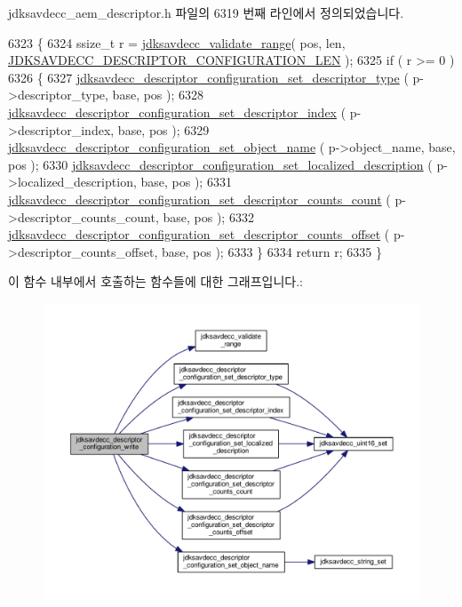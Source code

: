 jdksavdecc\+\_\+aem\+\_\+descriptor.\+h 파일의 6319 번째 라인에서 정의되었습니다.


\begin{DoxyCode}
6323 \{
6324     ssize\_t r = \hyperlink{group__util_ga9c02bdfe76c69163647c3196db7a73a1}{jdksavdecc\_validate\_range}( pos, len, 
      \hyperlink{group__descriptor__configuration_ga78260215d98013c8862d07707d8e1a85}{JDKSAVDECC\_DESCRIPTOR\_CONFIGURATION\_LEN} );
6325     \textcolor{keywordflow}{if} ( r >= 0 )
6326     \{
6327         \hyperlink{group__descriptor__configuration_gaa6ec231100cf99ad1d5ed13f18fa6796}{jdksavdecc\_descriptor\_configuration\_set\_descriptor\_type}
      ( p->descriptor\_type, base, pos );
6328         \hyperlink{group__descriptor__configuration_gaa70e9bd8e84cc7e6a9d1fc70b34e953a}{jdksavdecc\_descriptor\_configuration\_set\_descriptor\_index}
      ( p->descriptor\_index, base, pos );
6329         \hyperlink{group__descriptor__configuration_ga3e4d1b14aa53cfddc40de732b4974e4f}{jdksavdecc\_descriptor\_configuration\_set\_object\_name}
      ( p->object\_name, base, pos );
6330         \hyperlink{group__descriptor__configuration_ga2787526a8563ed9d37aff47b667a9a4c}{jdksavdecc\_descriptor\_configuration\_set\_localized\_description}
      ( p->localized\_description, base, pos );
6331         \hyperlink{group__descriptor__configuration_ga95664658d63b1969c366223dadfbf071}{jdksavdecc\_descriptor\_configuration\_set\_descriptor\_counts\_count}
      ( p->descriptor\_counts\_count, base, pos );
6332         \hyperlink{group__descriptor__configuration_gae51fa62f1486319812401b14b291ecd0}{jdksavdecc\_descriptor\_configuration\_set\_descriptor\_counts\_offset}
      ( p->descriptor\_counts\_offset, base, pos );
6333     \}
6334     \textcolor{keywordflow}{return} r;
6335 \}
\end{DoxyCode}


이 함수 내부에서 호출하는 함수들에 대한 그래프입니다.\+:
\nopagebreak
\begin{figure}[H]
\begin{center}
\leavevmode
\includegraphics[width=350pt]{group__descriptor__configuration_gac2652eee3241c968c2c583068a5f8d5a_cgraph}
\end{center}
\end{figure}


